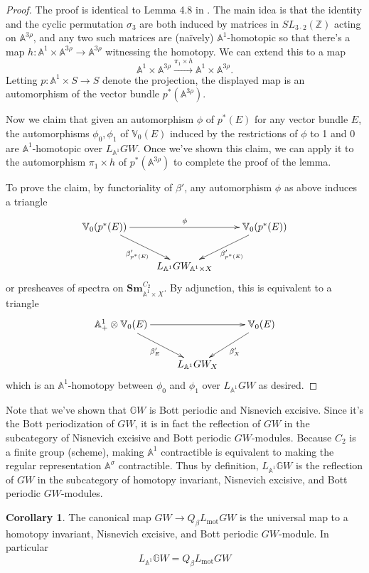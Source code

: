 \documentclass[edeposit,fullpage]{uiucthesis2009}
\newcommand{\Z}{\mathbb Z}
\newcommand{\mbb}{\mathbb}
\newcommand{\Sm}[1]{\mathbf{Sm}_{#1}}
\theoremstyle{plain}
\numberwithin{lemma}{section}
\theoremstyle{definition}
\newtheorem{corollary}[lemma]{Corollary}
\begin{document}
\begin{proof}
The proof is identical to Lemma 4.8 in \cite{cdhdesc}. The main idea
is that the identity and the cyclic permutation $\sigma_3$ are both
induced by matrices in $SL_{3\cdot 2}(\Z)$ acting on $\mbb A^{3\rho}$,
and any two such matrices are (na\"ively) $\mbb A^1$-homotopic so
that there's a map $h: \mbb A^1 \times \mbb A^{3\rho} \rightarrow \mbb
A^{3\rho}$ witnessing the homotopy. We can extend this to a map
\[
\mbb A^1 \times \mbb A^{3\rho} \xrightarrow{\pi_1 \times h} \mbb A^1 \times \mbb A^{3\rho}.
\]
Letting $p : \mbb A^1 \times S \rightarrow S$ denote the projection, the
displayed map is an automorphism of the vector bundle $p^*(\mbb
A^{3\rho})$.

Now we claim that given an automorphism $\phi$ of $p^*(E)$ for
any vector bundle $E$, the automorphisms $\phi_0,\phi_1$ of $\mbb
V_0(E)$ induced by the restrictions of $\phi$ to 1 and 0 are $\mbb
A^1$-homotopic over $L_{\mbb A^1}GW$. Once we've shown this claim, we can
apply it to the
automorphism $\pi_1 \times h$ of $p^*(\mbb A^{3\rho})$ to complete the
proof of the lemma. 

To prove the claim, by functoriality of $\beta'$, any automorphism
$\phi$ as above induces a triangle
\[
\xymatrix{\mbb V_0(p^*(E)) \ar[rr]^\phi \ar[dr]_{\beta'_{p^*(E)}} & & \mbb V_0(p^*(E))
  \ar[dl]^{\beta'_{p^*(E)}} \\ & L_{\mbb A^1}GW_{\mbb A^1 \times X}}
\]
or presheaves of spectra on $\Sm{\mbb A^1 \times X}^{C_2}$. By
adjunction, this is equivalent to a triangle
\[
\xymatrix{\mbb A^1_+ \otimes \mbb V_0(E) \ar[rr] \ar[dr]_{\beta'_E} && \mbb V_0(E)
  \ar[dl]^{\beta'_X} \\ & L_{\mbb A^1}GW_X}
\]
which is an $\mbb A^1$-homotopy between $\phi_0$ and $\phi_1$ over
$L_{\mbb A^1}GW$ as desired.
\end{proof}

Note that we've shown that $\mbb GW$ is Bott periodic and
Nisnevich excisive. Since it's the Bott periodization of $GW$, it is
in fact the reflection of $GW$
in the subcategory of Nisnevich excisive and Bott periodic
$GW$-modules. Because $C_2$ is a finite group (scheme), making $\mbb
A^1$ contractible is equivalent to making the regular representation
$\mbb A^\sigma$ contractible. Thus by definition, $L_{\mbb A^1}\mbb
GW$ is the reflection of $GW$ in the subcategory of homotopy
invariant, Nisnevich excisive, and Bott periodic $GW$-modules. 

\begin{corollary}\label{cor:MotLoc_GW}
The canonical map $GW \rightarrow Q_{\beta}L_{\mathrm{mot}}GW$ is the universal
map to a homotopy invariant, Nisnevich excisive, and Bott periodic
$GW$-module. In particular
\[
L_{\mbb A^1}\mbb GW = Q_{\beta}L_{\mathrm{mot}}GW
\]
\end{corollary}
\end{document}
